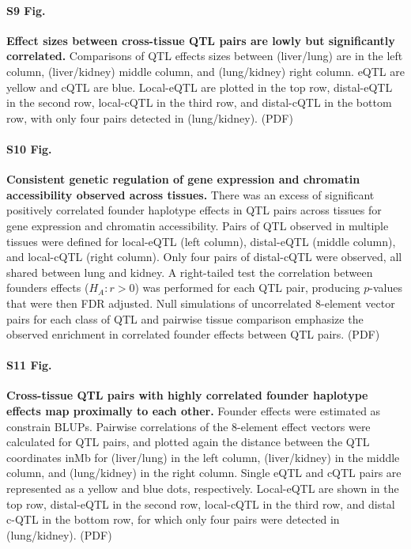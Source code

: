\documentclass[10pt,letterpaper]{article}
\begin{document}
\paragraph*{S9 Fig.}
\label{S_qtl_effect_size_comparison}
{\bf Effect sizes between cross-tissue QTL pairs are lowly but significantly correlated.}
Comparisons of QTL effects sizes between (liver/lung) are in the left column, (liver/kidney) middle column, and (lung/kidney) right column. eQTL are yellow and cQTL are blue. Local-eQTL are plotted in the top row, distal-eQTL in the second row, local-cQTL in the third row, and distal-cQTL in the bottom row, with only four pairs detected in (lung/kidney). (PDF)

\paragraph*{S10 Fig.}
\label{S_qtl_pair_histograms}
{\bf Consistent genetic regulation of gene expression and chromatin accessibility observed across tissues.}
There was an excess of significant positively correlated founder haplotype effects in QTL pairs across tissues for gene expression and chromatin accessibility. Pairs of QTL observed in multiple tissues were defined for local-eQTL (left column), distal-eQTL (middle column), and local-cQTL (right column). Only four pairs of distal-cQTL were observed, all shared between lung and kidney. A right-tailed test the correlation between founders effects ($H_{A}: r > 0$) was performed for each QTL pair, producing $p$-values that were then FDR adjusted. Null simulations of uncorrelated 8-element vector pairs for each class of QTL and pairwise tissue comparison emphasize the observed enrichment in correlated founder effects between QTL pairs. (PDF)

\paragraph*{S11 Fig.}
\label{S_qtl_cor_by_distance_comparison}
{\bf Cross-tissue QTL pairs with highly correlated founder haplotype effects map proximally to each other.}
Founder effects were estimated as constrain BLUPs. Pairwise correlations of the 8-element effect vectors were calculated for QTL pairs, and plotted again the distance between the QTL coordinates inMb for (liver/lung) in the left column, (liver/kidney) in the middle column, and (lung/kidney) in the right column. Single eQTL and cQTL pairs are represented as a yellow and blue dots, respectively. Local-eQTL are shown in the top row, distal-eQTL in the second row, local-cQTL in the third row, and distal c-QTL in the bottom row, for which only four pairs were detected in (lung/kidney). (PDF)
\end{document}
